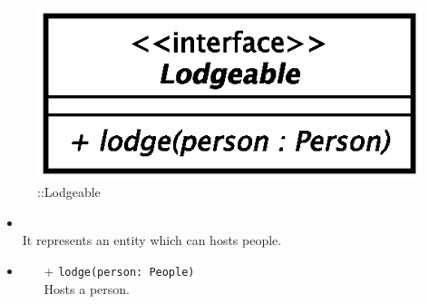 \begin{figure}[h]
\centering
\includegraphics[scale=0.6,keepaspectratio]{images/solution/app/backend/lodgeable.eps}
\caption{\pReactiveComponentStretchDecoration::Lodgeable}
\label{fig:sd-app-lodgeable}
\end{figure}
\FloatBarrier
\begin{itemize}
  \item \textbf{\descr} \\
    It represents an entity which can hosts people.
  \item \textbf{\ops}
  \begin{itemize}
   \item[+] \texttt{lodge(person: People)} \\
Hosts a person.   
  \end{itemize}
\end{itemize}
